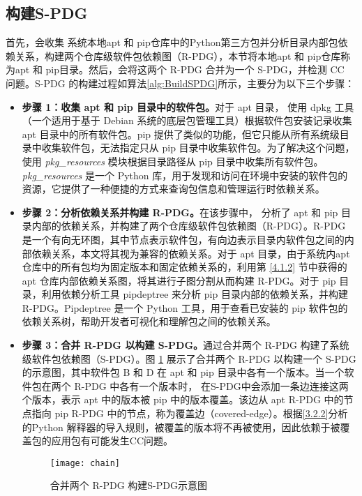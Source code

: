 \subsection{构建S-PDG}\label{4.2.1}
首先，\tool{}会收集 系统本地apt 和 pip仓库中的Python第三方包并分析目录内部包依赖关系，构建两个仓库级软件包依赖图（R-PDG），本节将本地apt 和 pip仓库称为apt 和 pip目录。然后，\tool{}会将这两个 R-PDG 合并为一个 S-PDG，并检测 CC 问题。S-PDG 的构建过程如算法\ref{alg:BuildSPDG}所示，主要分为以下三个步骤：

\begin{itemize}
	\item \textbf{步骤 1：收集 apt 和 pip 目录中的软件包。}对于 apt 目录，\tool{} 使用 dpkg  工具（一个适用于基于 Debian 系统的底层包管理工具）根据软件包安装记录收集 apt 目录中的所有软件包。pip 提供了类似的功能，但它只能从所有系统级目录中收集软件包，无法指定只从 pip 目录中收集软件包。为了解决这个问题，\tool{} 使用 \textit{pkg\_resources} 模块根据目录路径从 pip 目录中收集所有软件包。\textit{pkg\_resources} 是一个 Python 库，用于发现和访问在环境中安装的软件包的资源，它提供了一种便捷的方式来查询包信息和管理运行时依赖关系。
	\item \textbf{步骤 2：分析依赖关系并构建 R-PDG。}在该步骤中，\tool{} 分析了 apt 和 pip 目录内部的依赖关系，并构建了两个仓库级软件包依赖图（R-PDG）。R-PDG 是一个有向无环图，其中节点表示软件包，有向边表示目录内软件包之间的内部依赖关系，本文将其视为兼容的依赖关系。对于 apt 目录，由于系统内apt仓库中的所有包均为固定版本和固定依赖关系的，\tool{}利用第 \ref{4.1.2} 节中获得的 apt 仓库内部依赖关系图，将其进行子图分割从而构建 R-PDG。对于 pip 目录，\tool{}利用依赖分析工具 pipdeptree  来分析 pip 目录内部的依赖关系，并构建 R-PDG。Pipdeptree 是一个 Python 工具，用于查看已安装的 pip 软件包的依赖关系树，帮助开发者可视化和理解包之间的依赖关系。
	\item \textbf{步骤 3：合并 R-PDG 以构建 S-PDG。}\tool{}通过合并两个 R-PDG 构建了系统级软件包依赖图（S-PDG）。图 \ref{fig:PDG} 展示了合并两个 R-PDG 以构建一个 S-PDG 的示意图，其中软件包 B 和 D 在 apt 和 pip 目录中各有一个版本。当一个软件包在两个 R-PDG 中各有一个版本时，\tool{} 在S-PDG中会添加一条边连接这两个版本，表示 apt 中的版本被 pip 中的版本覆盖。该边从 apt R-PDG 中的节点指向 pip R-PDG 中的节点，称为覆盖边（covered-edge）。根据\ref{3.2.2}分析的Python 解释器的导入规则，被覆盖的版本将不再被使用，因此依赖于被覆盖包的应用包有可能发生CC问题。
	\begin{figure}[htbp] %
		\centering
		\texttt{[image: chain]}
		\caption{合并两个 R-PDG 构建S-PDG示意图}
		\label{fig:PDG}
	\end{figure}
	
\end{itemize}
